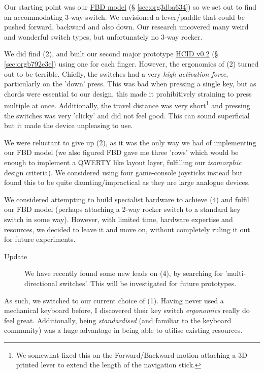 \documentclass[logo,bsc,singlespacing,parskip]{infthesis}
\begin{document}
Our starting point was our \hyperref[sec:org3dba634]{FBD model} (§ \ref{sec:org3dba634}) so we set out to find an accommodating 3-way switch.
We envisioned a lever/paddle that could be pushed forward, backward and also down.
Our research uncovered many weird and wonderful switch types, but unfortunately no 3-way rocker.

We did find (2), and built our second major prototype \hyperref[sec:orgb792e3e]{HCID v0.2} (§ \ref{sec:orgb792e3e}) using one for each finger.
However, the ergonomics of (2) turned out to be terrible.
Chiefly, the switches had a very \emph{high activation force}, particularly on the 'down' press.
This was bad  when pressing a single key, but as chords were essential to our design, this made it prohibitively straining to press multiple at once.
Additionally, the travel distance was very short\footnote{We somewhat fixed this on the Forward/Backward motion attaching a 3D printed lever to extend the length of the navigation stick.} and pressing the switches was very 'clicky' and did not feel good.
This can sound superficial but it made the device unpleasing to use.

We were reluctant to give up (2), as it was the only way we had of implementing our FBD model (we also figured FBD gave me three 'rows' which would be enough to implement a QWERTY like layout layer, fulfilling our \emph{isomorphic} design criteria).
We considered using four game-console joysticks instead but found this to be quite daunting/impractical as they are large analogue devices.

We considered attempting to build specialist hardware to achieve (4) and fulfil our FBD model (perhaps attaching a 2-way rocker switch to a standard key switch in some way).
However, with limited time, hardware expertise and resources, we decided to leave it and move on, without completely ruling it out for future experiments. \\

\begin{mdframed}
\begin{description}
\item[{Update}] We have recently found some new leads on (4), by searching for 'multi-directional switches'.
This will be investigated for future prototypes.
\end{description}
\end{mdframed}


As such, we switched to our current choice of (1).
Having never used a mechanical keyboard before, I discovered their key switch \emph{ergonomics} really do feel great.
Additionally, being \emph{standardised} (and familiar to the keyboard community) was a huge advantage in being able to utilise existing resources.
\end{document}
